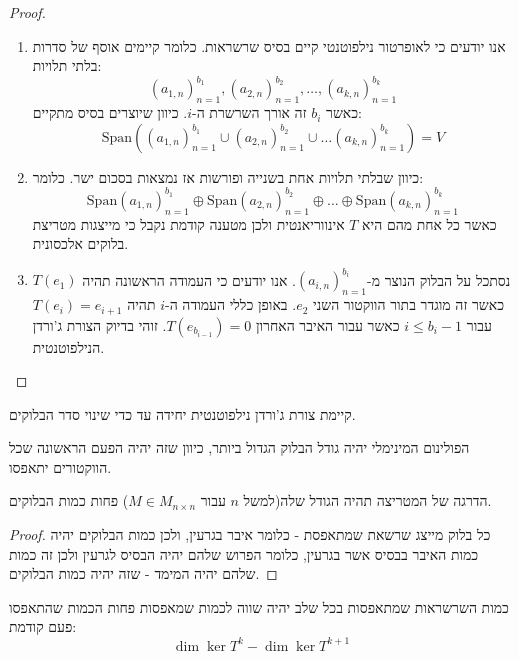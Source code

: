\documentclass{tstextbook}
\begin{document}
\begin{proof}
  \begin{enumerate}
    \item אנו יודעים כי לאופרטור נילפוטנטי קיים בסיס שרשראות. כלומר קיימים אוסף של סדרות בלתי תלויות: 
$$(a_{1,n})_{n=1}^{b_{1}},(a_{2,n})_{n=1}^{b_{2}},\dots,(a_{k,n})_{n=1}^{b_{k}}$$
כאשר \(b_{i}\) זה אורך השרשרת ה-\(i\). כיוון שיוצרים בסיס מתקיים:
$$\mathrm{Span}\left( (a_{1,n})_{n=1}^{b_{1}}\cup (a_{2,n})_{n=1}^{b_{2}}\cup\dots (a_{k,n})_{n=1}^{b_{k}} \right)=V$$


    \item כיוון שבלתי תלויות אחת בשנייה ופורשות אז נמצאות בסכום ישר. כלומר: 
$$\mathrm{Span}(a_{1,n})_{n=1}^{b_{1}}\oplus \mathrm{Span}(a_{2,n})_{n=1}^{b_{2}}\oplus \dots \oplus \mathrm{Span}(a_{k,n})_{n=1}^{b_{k}}$$
כאשר כל אחת מהם היא \(T\) אינווריאנטית ולכן מטענה קודמת נקבל כי מייצגות מטריצת בלוקים אלכסונית. 


    \item נסתכל על הבלוק הנוצר מ-\((a_{i,n})_{n=1}^{b_{i}}\). אנו יודעים כי העמודה הראשונה תהיה \(T(e_{1})\) כאשר זה מוגדר בתור הווקטור השני \(e_{2}\). באופן כללי העמודה ה-\(i\) תהיה \(T(e_{i})=e_{i+1}\) עבור \(i\leq b_{i}-1\) כאשר עבור האיבר האחרון \(T(e_{b_{i-1}})=0\). זוהי בדיוק הצורת ג'ורדן הנילפוטנטית. 


  \end{enumerate}
\end{proof}
\begin{corollary}
קיימת צורת ג'ורדן נילפוטנטית יחידה עד כדי שינוי סדר הבלוקים.

\end{corollary}
\begin{proposition}
הפולינום המינימלי יהיה גודל הבלוק הגדול ביותר, כיוון שזה יהיה הפעם הראשונה שכל הווקטורים יתאפסו.

\end{proposition}
\begin{proposition}
הדרגה של המטריצה תהיה הגודל שלה(למשל \(n\) עבור \(M \in M_{n\times n}\)) פחות כמות הבלוקים. 

\end{proposition}
\begin{proof}
כל בלוק מייצג שרשאת שמתאפסת - כלומר איבר בגרעין, ולכן כמות הבלוקים יהיה כמות האיבר בבסיס אשר בגרעין, כלומר הפרוש שלהם יהיה הבסיס לגרעין ולכן זה כמות שלהם יהיה המימד - שזה יהיה כמות הבלוקים.

\end{proof}
\begin{proposition}
כמות השרשראות שמתאפסות בכל שלב יהיה שווה לכמות שמאפסות פחות הכמות שהתאפסו פעם קודמת: 
$$\dim \ker T^k -\dim \ker T^{k+1}$$

\end{proposition}
\end{document}
